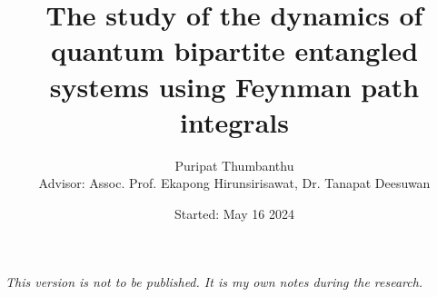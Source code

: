 \documentclass[a4paper, 11pt, openleft]{memoir}
\begin{document}
\title{The study of the dynamics of quantum bipartite entangled systems using Feynman path integrals}
\author{Puripat Thumbanthu \\ Advisor: Assoc. Prof. Ekapong Hirunsirisawat, Dr. Tanapat Deesuwan}
\date{Started: May 16 2024}

\maketitle

\begin{center}
\emph{This version is not to be published. It is my own notes during the research.}
\end{center}

\tableofcontents*











\appendix


\end{document}
